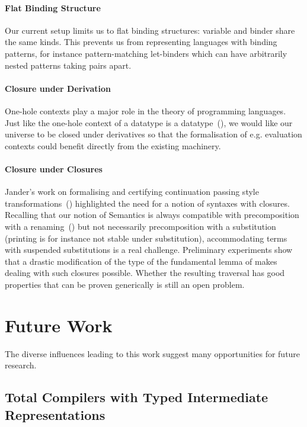 \paragraph{Flat Binding Structure} Our current setup limits us to flat binding
structures: variable and binder share the same kinds. This prevents us from
representing languages with binding patterns, for instance pattern-matching
let-binders which can have arbitrarily nested patterns taking pairs apart.

\paragraph{Closure under Derivation} One-hole contexts play a major role in the
theory of programming languages. Just like the one-hole context of a datatype is
a datatype~(\cite{DBLP:journals/fuin/AbbottAMG05}), we would like our universe
to be closed under derivatives so that the formalisation of e.g. evaluation
contexts could benefit directly from the existing machinery.

\paragraph{Closure under Closures} Jander's work on formalising and certifying
continuation passing style transformations~(\cite{Jander:Thesis:2019})
highlighted the need for a notion of syntaxes with closures. Recalling
that our notion of Semantics is always compatible with precomposition
with a renaming~(\cite{Kaiser-wsdebr}) but not necessarily
precomposition with a substitution (printing is for instance not
stable under substitution), accommodating terms with suspended
substitutions is a real challenge. Preliminary experiments show that a
drastic modification of the type of the fundamental lemma of
 makes dealing with such closures possible. Whether the
resulting traversal has good properties that can be proven generically
is still an open problem.

\section{Future Work}

The diverse influences leading to this work suggest many opportunities
for future research.

\subsection{Total Compilers with Typed Intermediate Representations}

